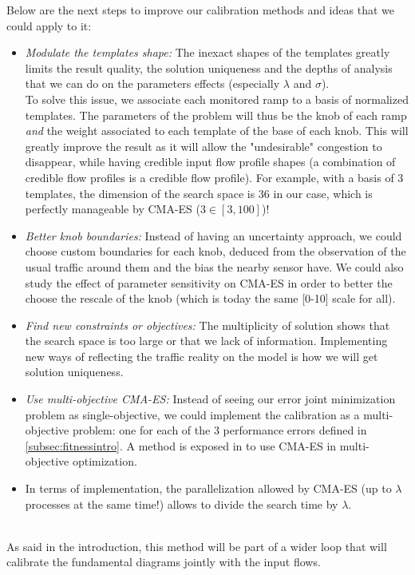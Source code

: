 Below are the next steps to improve our calibration methods and ideas that we could apply to it: 

\begin{itemize}
\item \emph{Modulate the templates shape:} The inexact shapes of the templates greatly limits the result quality, the solution uniqueness and the depths of analysis that we can do on the parameters effects (especially $\lambda$ and $\sigma$).\\
To solve this issue, we associate each monitored ramp to a basis of normalized templates. The parameters of the problem will thus be the knob of each ramp \emph{and} the weight associated to each template of the base of each knob. This will greatly improve the result as it will allow the "undesirable" congestion to disappear, while having credible input flow profile shapes (a combination of credible flow profiles is a credible flow profile).
For example, with a basis of 3 templates, the dimension of the search space is $36$ in our case, which is perfectly manageable by CMA-ES ($3\in [3,100]$)!
\item \emph{Better knob boundaries:} Instead of having an uncertainty approach, we could choose custom boundaries for each knob, deduced from the observation of the usual traffic around them and the bias the nearby sensor have. We could also study the effect of parameter sensitivity on CMA-ES in order to better the choose the rescale of the knob (which is today the same [0-10] scale for all).
\item \emph{Find new constraints or objectives:} The multiplicity of solution shows that the search space is too large or that we lack of information. Implementing new ways of reflecting the traffic reality on the model is how we will get solution uniqueness.
\item \emph{Use multi-objective CMA-ES:} Instead of seeing our error  joint minimization problem as single-objective, we could implement the calibration as a multi-objective problem: one for each of the 3 performance errors defined in \ref{subsec:fitnessintro}. A method is exposed in \cite{mocmaes} to use CMA-ES in  multi-objective optimization.
\item In terms of implementation, the parallelization allowed by CMA-ES (up to $\lambda$ processes at the same time!) allows to divide the search time by $\lambda$.
\end{itemize}
~\\
As said in the introduction, this method will be part of a wider loop that will calibrate the fundamental diagrams jointly with the input flows.
